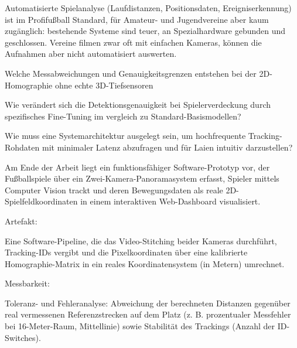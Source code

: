 \abschnittsautor{\alleautoren}


Automatisierte Spielanalyse (Laufdistanzen, Positionsdaten, Ereigniserkennung) ist im Profifußball Standard, 
für Amateur- und Jugendvereine aber kaum zugänglich: bestehende 
Systeme sind teuer, an Spezialhardware gebunden und geschlossen. 
Vereine filmen zwar oft mit einfachen Kameras, können die 
Aufnahmen aber nicht automatisiert auswerten.


Welche Messabweichungen und Genauigkeitsgrenzen entstehen bei der 
2D-Homographie ohne echte 3D-Tiefsensoren

Wie verändert sich die Detektionsgenauigkeit bei Spielerverdeckung
durch spezifisches Fine-Tuning im vergleich zu Standard-Basismodellen?

Wie muss eine Systemarchitektur ausgelegt sein, 
um hochfrequente Tracking-Rohdaten mit minimaler Latenz 
abzufragen und für Laien intuitiv darzustellen?

Am Ende der Arbeit liegt ein funktionsfähiger Software-Prototyp 
vor, der Fußballspiele über ein Zwei-Kamera-Panoramasystem 
erfasst, Spieler mittels Computer Vision trackt und deren 
Bewegungsdaten als reale 2D-Spielfeldkoordinaten in einem 
interaktiven Web-Dashboard visualisiert.


Artefakt:

Eine Software-Pipeline, die das Video-Stitching beider Kameras 
durchführt, Tracking-IDs vergibt und die Pixelkoordinaten über 
eine kalibrierte Homographie-Matrix in ein reales Koordinatensystem
(in Metern) umrechnet.

Messbarkeit:

Toleranz- und Fehleranalyse: Abweichung der berechneten Distanzen
gegenüber real vermessenen Referenzstrecken auf dem Platz 
(z. B. prozentualer Messfehler bei 16-Meter-Raum, Mittellinie) 
sowie Stabilität des Trackings (Anzahl der ID-Switches).

